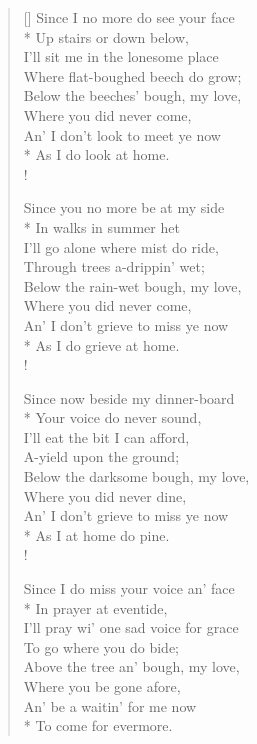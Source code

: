 \documentclass[MAIN]{subfiles}
\begin{document}
\settowidth{\versewidth}{\vin Where flat-boughed beech do grow;}
\begin{verse}[\versewidth]
Since I no more do see your face\\*
\vin Up stairs or down below,\\
I'll sit me in the lonesome place\\
\vin Where flat-boughed beech do grow;\\
Below the beeches' bough, my love,\\
\vin Where you did never come,\\
An' I don't look to meet ye now\\*
\vin As I do look at home.\\!

Since you no more be at my side\\*
\vin In walks in summer het\\
I'll go alone where mist do ride,\\
\vin Through trees a-drippin' wet;\\
Below the rain-wet bough, my love,\\
\vin Where you did never come,\\
An' I don't grieve to miss ye now\\*
\vin As I do grieve at home.\\!

Since now beside my dinner-board\\*
\vin Your voice do never sound,\\
I'll eat the bit I can afford,\\
\vin A-yield upon the ground;\\
Below the darksome bough, my love,\\
\vin Where you did never dine,\\
An' I don't grieve to miss ye now\\*
\vin As I at home do pine.\\!

Since I do miss your voice an' face\\*
\vin In prayer at eventide,\\
I'll pray wi' one sad voice for grace\\
\vin To go where you do bide;\\
Above the tree an' bough, my love,\\
\vin Where you be gone afore,\\
An' be a waitin' for me now\\*
\vin To come for evermore.
\end{verse}
\end{document}
